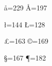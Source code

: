 \chardef\aa=229 \chardef\AA=197	%
\chardef{} \chardef{}	%


\chardef\l=144 \chardef\L=128	%

\chardef\pounds=163 \chardef\copyright=169

\chardef{} \chardef{}

\chardef\S=167 \chardef\P=182	%


\chardef{} \chardef{}		%
\chardef{} \chardef{}		%



\def\.#1{{\accent5 #1}}		%
\def\H#1{{\accent6 #1}}		%
\def\k#1{{\accent7 #1}}		%






